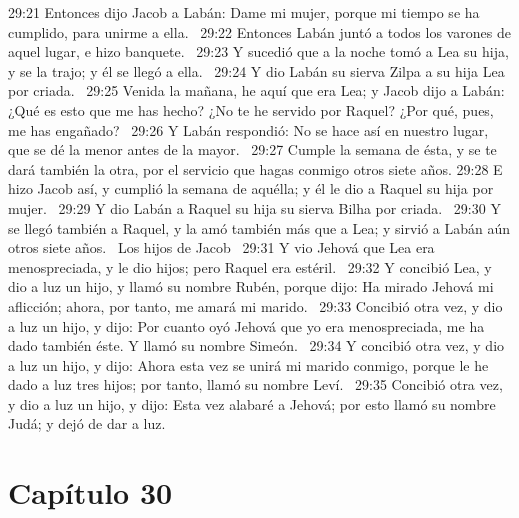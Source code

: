 29:21 Entonces dijo Jacob a Labán: Dame mi mujer, porque mi tiempo se ha cumplido, para unirme a ella.  
29:22 Entonces Labán juntó a todos los varones de aquel lugar, e hizo banquete.  
29:23 Y sucedió que a la noche tomó a Lea su hija, y se la trajo; y él se llegó a ella.  
29:24 Y dio Labán su sierva Zilpa a su hija Lea por criada.  
29:25 Venida la mañana, he aquí que era Lea; y Jacob dijo a Labán: ¿Qué es esto que me has hecho? ¿No te he servido por Raquel? ¿Por qué, pues, me has engañado?  
29:26 Y Labán respondió: No se hace así en nuestro lugar, que se dé la menor antes de la mayor.  
29:27 Cumple la semana de ésta, y se te dará también la otra, por el servicio que hagas conmigo otros siete años. 
29:28 E hizo Jacob así, y cumplió la semana de aquélla; y él le dio a Raquel su hija por mujer.  
29:29 Y dio Labán a Raquel su hija su sierva Bilha por criada.  
29:30 Y se llegó también a Raquel, y la amó también más que a Lea; y sirvió a Labán aún otros siete años.  
Los hijos de Jacob  
29:31 Y vio Jehová que Lea era menospreciada, y le dio hijos; pero Raquel era estéril.  
29:32 Y concibió Lea, y dio a luz un hijo, y llamó su nombre Rubén, porque dijo: Ha mirado Jehová mi aflicción; ahora, por tanto, me amará mi marido.  
29:33 Concibió otra vez, y dio a luz un hijo, y dijo: Por cuanto oyó Jehová que yo era menospreciada, me ha dado también éste. Y llamó su nombre Simeón.  
29:34 Y concibió otra vez, y dio a luz un hijo, y dijo: Ahora esta vez se unirá mi marido conmigo, porque le he dado a luz tres hijos; por tanto, llamó su nombre Leví.  
29:35 Concibió otra vez, y dio a luz un hijo, y dijo: Esta vez alabaré a Jehová; por esto llamó su nombre Judá; y dejó de dar a luz.  

\section*{Capítulo 30 }

